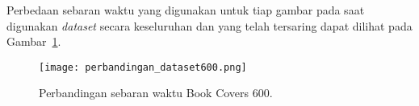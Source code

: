 Perbedaan sebaran waktu yang digunakan untuk tiap gambar pada saat digunakan \textit{dataset} secara keseluruhan dan yang telah tersaring dapat dilihat pada Gambar~\ref{fig:perbandingan_dataset600}.

\begin{figure}[H]
	\centering
	\texttt{[image: perbandingan\_dataset600.png]}
	\caption{Perbandingan sebaran waktu Book Covers 600.}
	\label{fig:perbandingan_dataset600}
\end{figure}

